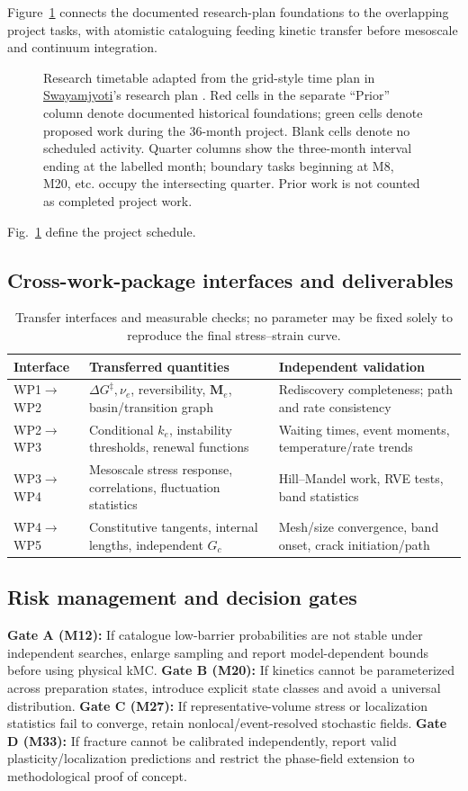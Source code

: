 \documentclass[11pt,a4paper]{article}
\begin{document}
Figure~\ref{fig:research_timetable} connects the documented research-plan foundations to the overlapping project tasks, with atomistic cataloguing feeding kinetic transfer before mesoscale and continuum integration. 
\begin{figure}[p]
\centering

\caption{Research timetable adapted from the grid-style time plan in \underline{Swayamjyoti}'s research plan \cite{swayplan}. Red cells in the separate ``Prior'' column denote documented historical foundations; green cells denote proposed work during the 36-month project. Blank cells denote no scheduled activity. Quarter columns show the three-month interval ending at the labelled month; boundary tasks beginning at M8, M20, etc. occupy the intersecting quarter. Prior work is not counted as completed project work.}\label{fig:research_timetable}
\end{figure}
Fig.~\ref{fig:research_timetable} define the project schedule.
\subsection{Cross-work-package interfaces and deliverables}
\begin{table}[h]\centering\small
\caption{Transfer interfaces and measurable checks; no parameter may be fixed solely to reproduce the final stress--strain curve.}
\begin{tabularx}{\textwidth}{p{2cm}X X}\toprule Interface&Transferred quantities&Independent validation\\\midrule
WP1$\to$WP2&$\Delta G^\ddagger,\nu_e$, reversibility, $\mathbf M_e$, basin/transition graph&Rediscovery completeness; path and rate consistency\\
WP2$\to$WP3&Conditional $k_e$, instability thresholds, renewal functions&Waiting times, event moments, temperature/rate trends\\
WP3$\to$WP4&Mesoscale stress response, correlations, fluctuation statistics&Hill--Mandel work, RVE tests, band statistics\\
WP4$\to$WP5&Constitutive tangents, internal lengths, independent $G_c$&Mesh/size convergence, band onset, crack initiation/path\\\bottomrule
\end{tabularx}
\end{table}
\FloatBarrier
\FloatBarrier
\subsection{Risk management and decision gates}
\textbf{Gate A (M12):} If catalogue low-barrier probabilities are not stable under independent searches, enlarge sampling and report model-dependent bounds before using physical kMC. \textbf{Gate B (M20):} If kinetics cannot be parameterized across preparation states, introduce explicit state classes and avoid a universal distribution. \textbf{Gate C (M27):} If representative-volume stress or localization statistics fail to converge, retain nonlocal/event-resolved stochastic fields. \textbf{Gate D (M33):} If fracture cannot be calibrated independently, report valid plasticity/localization predictions and restrict the phase-field extension to methodological proof of concept.
\end{document}
